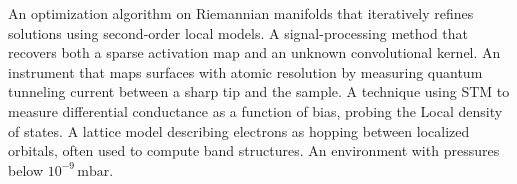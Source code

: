 \begin{acronym}
 An optimization algorithm on Riemannian manifolds that iteratively refines solutions using second-order local models.  
 A signal-processing method that recovers both a sparse activation map and an unknown convolutional kernel.  
 An instrument that maps surfaces with atomic resolution by measuring quantum tunneling current between a sharp tip and the sample.  
 A technique using STM to measure differential conductance as a function of bias, probing the Local density of states.  
 A lattice model describing electrons as hopping between localized orbitals, often used to compute band structures.  
 An environment with pressures below \(10^{-9}\,\mathrm{mbar}\).

\end{acronym}

% 
